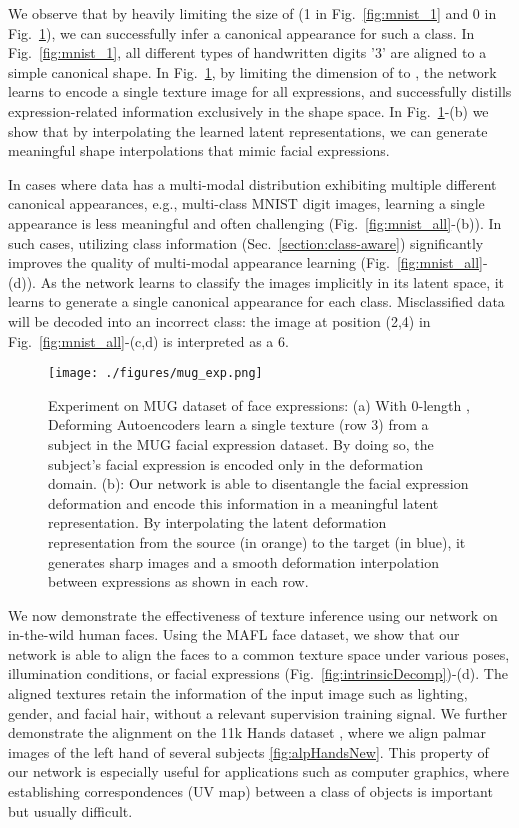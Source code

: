 \documentclass[runningheads]{llncs}
\begin{document}
We observe that by heavily limiting the size of  (1 in Fig.~\ref{fig:mnist_1} and 0 in Fig.~\ref{fig:MUG_1}), we can successfully infer a canonical appearance for such a class. In Fig.~\ref{fig:mnist_1}, all different types of handwritten digits '3' are aligned to a simple canonical shape. In Fig.~\ref{fig:MUG_1}, by limiting the dimension of  to , the network learns to encode a single texture image for all expressions, and successfully distills expression-related information exclusively in the  shape space. In Fig.~\ref{fig:MUG_1}-(b) we show that by interpolating the learned latent representations, we can generate meaningful shape interpolations that mimic facial expressions.  

In cases where data has a multi-modal distribution exhibiting multiple different canonical appearances, e.g., multi-class MNIST digit images, learning a single appearance is less meaningful and often challenging (Fig.~\ref{fig:mnist_all}-(b)). In such cases, utilizing class information (Sec.~\ref{section:class-aware}) significantly improves the quality of multi-modal appearance learning (Fig.~\ref{fig:mnist_all}-(d)). As the network learns to classify the images implicitly in its latent space, it learns to generate a single canonical appearance for each class. Misclassified data will be decoded into an incorrect class: the image at position (2,4) in Fig.~\ref{fig:mnist_all}-(c,d) is interpreted as a 6.


\begin{figure}
    \centering
    \texttt{[image: ./figures/mug\_exp.png]}
    \caption{ Experiment on MUG dataset of face expressions: (a) With 0-length , Deforming Autoencoders learn a single texture (row 3) from a subject in the MUG facial expression dataset. By doing so, the subject's facial expression is encoded only in the deformation domain.
    (b): Our network is able to disentangle the facial expression deformation and encode this information in a meaningful latent representation. By interpolating the latent deformation representation from the source (in orange) to the target (in blue), it generates sharp images and a smooth deformation interpolation between expressions as shown in each row.
    }
    \label{fig:MUG_1}
\end{figure}

We now demonstrate the effectiveness of texture inference using our network on in-the-wild human faces. Using the MAFL face dataset, we show that our network is able to align the faces to a common texture space under various poses, illumination conditions, or facial expressions (Fig.~\ref{fig:intrinsicDecomp})-(d). The aligned textures retain the information of the input image such as lighting, gender, and facial hair, without a relevant supervision training signal. We further demonstrate the alignment on the 11k Hands dataset \cite{afifiHands}, where
we align palmar images of the left hand of several subjects \ref{fig:alpHandsNew}. This property of our network is especially useful for applications such as computer graphics, where  establishing correspondences (UV map) between a class of objects is important but usually difficult.
\end{document}
